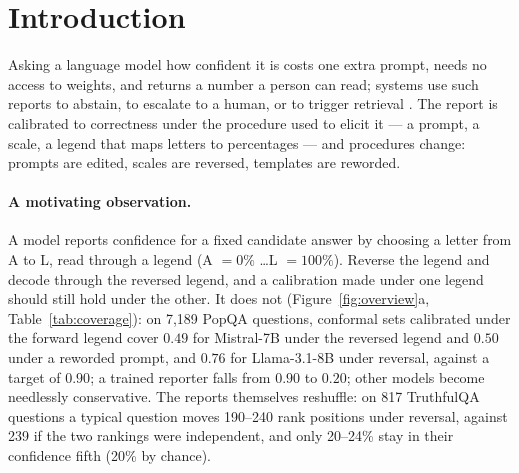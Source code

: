 \documentclass[11pt]{article}
\theoremstyle{definition}
\theoremstyle{remark}
\newcommand{\1}{\mathbf{1}}
\begin{document}
\section{Introduction}
\label{sec:intro}
Asking a language model how confident it is costs one extra prompt, needs no access to weights, and
returns a number a person can read; systems use such reports to abstain, to escalate to a human, or to
trigger retrieval \citep{kadavath2022language,tian2023just,xiong2024can}. The report is calibrated to
correctness under the procedure used to elicit it --- a prompt, a scale, a legend that maps letters to
percentages --- and procedures change: prompts are edited, scales are reversed, templates are reworded.

\paragraph{A motivating observation.}  A model reports confidence for a fixed candidate answer by
choosing a letter from A to L, read through a legend (A $=0\%$ \dots L $=100\%$). Reverse the legend
and decode through the reversed legend, and a calibration made under one legend should still hold under
the other. It does not (Figure~\ref{fig:overview}a, Table~\ref{tab:coverage}): on 7{,}189 PopQA questions, conformal
sets calibrated under the forward legend cover $0.49$ for Mistral-7B under the reversed legend and $0.50$ under a
reworded prompt, and $0.76$ for Llama-3.1-8B under reversal, against a target of $0.90$; a trained reporter falls
from $0.90$ to $0.20$; other models become needlessly conservative. The reports themselves reshuffle: on 817
TruthfulQA questions a typical question moves 190--240 rank positions under reversal, against 239 if the two
rankings were independent, and only 20--24\% stay in their confidence fifth (20\% by chance).
\end{document}
